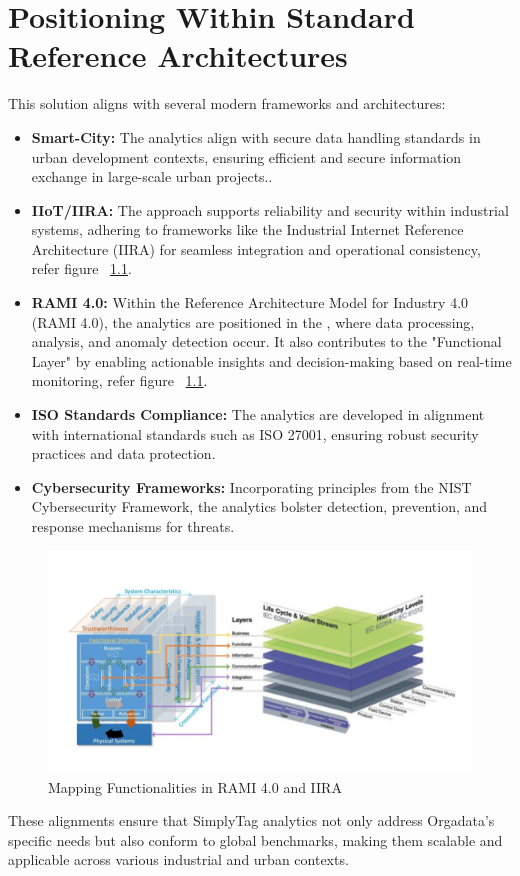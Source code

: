 %
%

\chapter{Positioning Within Standard Reference Architectures}

This solution aligns with several modern frameworks and architectures:

\begin{itemize}
	\item \textbf{Smart-City:} The analytics align with secure data handling standards in urban development contexts, ensuring efficient and secure information exchange in large-scale urban projects..
	\item \textbf{IIoT/IIRA:} The approach supports reliability and security within industrial systems, adhering to frameworks like the Industrial Internet Reference Architecture (IIRA) for seamless integration and operational consistency, refer figure ~\ref{RAMI_IIRA}.
	\item \textbf{RAMI 4.0:} Within the Reference Architecture Model for Industry 4.0 (RAMI 4.0), the analytics are positioned in the , where data processing, analysis, and anomaly detection occur. It also contributes to the "Functional Layer" by enabling actionable insights and decision-making based on real-time monitoring, refer figure ~\ref{RAMI_IIRA}.
	\item \textbf{ISO Standards Compliance:} The analytics are developed in alignment with international standards such as ISO 27001, ensuring robust security practices and data protection.
	\item \textbf{Cybersecurity Frameworks:} Incorporating principles from the NIST Cybersecurity Framework, the analytics bolster detection, prevention, and response mechanisms for threats.
\end{itemize}

\begin{figure}
	\begin{center}
		\includegraphics[width=0.7\linewidth]{Images/RAMI_IIRA.png}
		\caption{Mapping Functionalities in RAMI 4.0 and IIRA}
		\label{RAMI_IIRA}
	\end{center}
\end{figure}
  
  These alignments ensure that SimplyTag analytics not only address Orgadata’s specific needs but also conform to global benchmarks, making them scalable and applicable across various industrial and urban contexts.
  
   
  
   

 